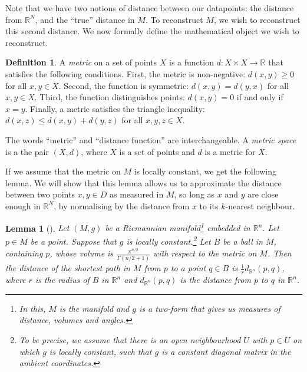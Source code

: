 \documentclass[a4paper,11pt,leqno]{article} \usepackage{amsmath}
\newcommand{\RR}{\mathbb{R}} \newcommand{\QQ}{\mathbb{Q}}
\newtheorem*{lemma}{Lemma}
\theoremstyle{definition}
\newtheorem{defn}{Definition}
\begin{document}
Note that we have two notions of distance between our datapoints: the distance
from $\RR^N$, and the ``true'' distance in $M$.
To reconstruct $M$, we wish to reconstruct this second distance.
We now formally define the mathematical object we wish to reconstruct.

\begin{defn}
  A \emph{metric} on a set of points $X$ is a function $d: X\times X\to \RR$
  that satisfies the following conditions.
  First, the metric is non-negative: $d(x, y) \geq 0$ for all $x, y\in X$.
  Second, the function is symmetric: $d(x, y) = d(y, x)$ for all $x, y\in X$.
  Third, the function distinguishes points: $d(x, y) = 0$ if and only if $x
  = y$.
  Finally, a metric satisfies the triangle inequality: $d(x, z)\leq d(x, y)
  + d(y, z)$ for all $x,y,z\in X$.
\end{defn}

The words ``metric'' and ``distance function'' are interchangeable.
A \emph{metric space} is a the pair $(X, d)$, where $X$ is a set of points and
$d$ is a metric for $X$.

If we assume that the metric on $M$ is locally constant, we get the following
lemma.
We will show that this lemma allows us to approximate the distance between two
points $x, y\in D$ as measured in $M$, so long as $x$ and $y$ are close enough
in $\RR^N$, by normalising by the distance from $x$ to its $k$-nearest
neighbour.

\begin{lemma}[\cite{McInnes18}]
  Let $(M, g)$ be a Riemannian manifold\footnote{
    In this, $M$ is the manifold and $g$ is a two-form that gives us measures of
    distance, volumes and angles.
  } embedded in $\RR^n$.
  Let $p\in M$ be a point.
  Suppose that $g$ is locally constant.\footnote{
    To be precise, we assume that there is an open neighbourhood $U$ with
    $p\in U$ on which $g$ is locally constant, such that $g$ is a constant
    diagonal matrix in the ambient coordinates.
  }
  Let $B$ be a ball in $M$, containing $p$, whose volume is
  $\frac{\pi^{n/2}}{\Gamma(n/2+1)}$ with respect to the metric on $M$.
  Then the distance of the shortest path in $M$ from $p$ to a point $q\in B$ is
  $\frac{1}{r}d_{\RR^n}(p, q)$, where $r$ is the radius of $B$ in $\RR^n$ and
  $d_{\RR^n}(p, q)$ is the distance from $p$ to $q$ in $\RR^n$.
\end{lemma}
\end{document}
